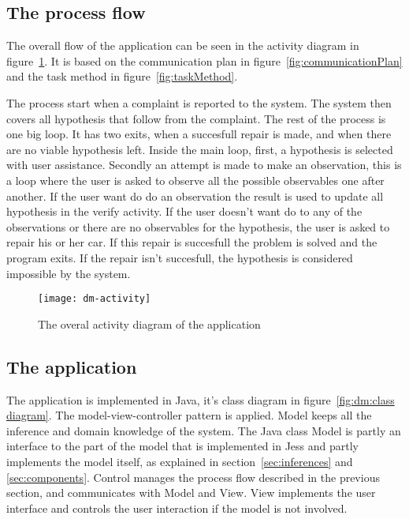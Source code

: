 \subsection{The process flow}
\label{sec:flow}

The overall flow of the application can be seen in the activity diagram in
figure~\ref{fig:dm:activity diagram}. It is based on the communication plan in figure~\ref{fig:communicationPlan}
and the task method in figure~\ref{fig:taskMethod}.

The process start when a complaint is reported to the system. The system then covers
all hypothesis that follow from the complaint. The rest of the process is one
big loop. It has two exits, when a succesfull repair is made, and when there are
no viable hypothesis left. Inside the main loop, first, a hypothesis is selected with
user assistance. Secondly an attempt is made to make an observation, this is a
loop where the user is asked to observe all the possible observables one after
another. If the user want do do an observation the result is used to update all
hypothesis in the verify activity. If the user doesn't want do to any of the
observations or there are no observables for the hypothesis, the user is asked
to repair his or her car. If this repair is succesfull the problem is solved and
the program exits. If the repair isn't succesfull, the hypothesis is considered
impossible by the system.

\begin{figure}[htbp]
    \centering
    \texttt{[image: dm-activity]}
    \caption{The overal activity diagram of the application}
    \label{fig:dm:activity diagram}
\end{figure}

\subsection{The application}
\label{sec:app}

The application is implemented in Java, it's class diagram in figure~\ref{fig:dm:class diagram}.
The model-view-controller pattern is applied. Model keeps all the inference and
domain knowledge of the system. The Java class Model is partly an interface to the part of the model
that is implemented in Jess and partly implements the model
itself, as explained in section~\ref{sec:inferences} and \ref{sec:components}.
Control manages the process flow described in the previous section, and
communicates with Model and View. View implements the user interface and controls the user
interaction if the model is not involved.

